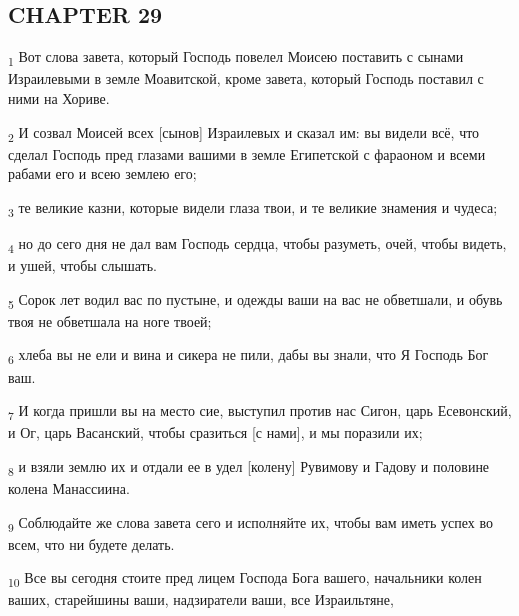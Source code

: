 \subsection{CHAPTER 29}
\begin{tcolorbox}
\textsubscript{1} Вот слова завета, который Господь повелел Моисею поставить с сынами Израилевыми в земле Моавитской, кроме завета, который Господь поставил с ними на Хориве.
\end{tcolorbox}
\begin{tcolorbox}
\textsubscript{2} И созвал Моисей всех [сынов] Израилевых и сказал им: вы видели всё, что сделал Господь пред глазами вашими в земле Египетской с фараоном и всеми рабами его и всею землею его;
\end{tcolorbox}
\begin{tcolorbox}
\textsubscript{3} те великие казни, которые видели глаза твои, и те великие знамения и чудеса;
\end{tcolorbox}
\begin{tcolorbox}
\textsubscript{4} но до сего дня не дал вам Господь сердца, чтобы разуметь, очей, чтобы видеть, и ушей, чтобы слышать.
\end{tcolorbox}
\begin{tcolorbox}
\textsubscript{5} Сорок лет водил вас по пустыне, и одежды ваши на вас не обветшали, и обувь твоя не обветшала на ноге твоей;
\end{tcolorbox}
\begin{tcolorbox}
\textsubscript{6} хлеба вы не ели и вина и сикера не пили, дабы вы знали, что Я Господь Бог ваш.
\end{tcolorbox}
\begin{tcolorbox}
\textsubscript{7} И когда пришли вы на место сие, выступил против нас Сигон, царь Есевонский, и Ог, царь Васанский, чтобы сразиться [с нами], и мы поразили их;
\end{tcolorbox}
\begin{tcolorbox}
\textsubscript{8} и взяли землю их и отдали ее в удел [колену] Рувимову и Гадову и половине колена Манассиина.
\end{tcolorbox}
\begin{tcolorbox}
\textsubscript{9} Соблюдайте же слова завета сего и исполняйте их, чтобы вам иметь успех во всем, что ни будете делать.
\end{tcolorbox}
\begin{tcolorbox}
\textsubscript{10} Все вы сегодня стоите пред лицем Господа Бога вашего, начальники колен ваших, старейшины ваши, надзиратели ваши, все Израильтяне,
\end{tcolorbox}
